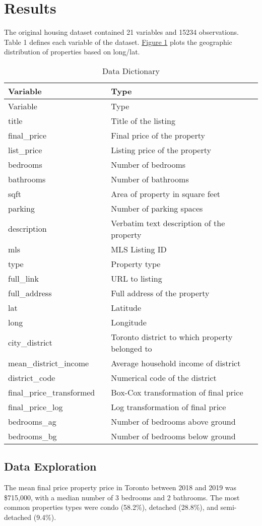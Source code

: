 \documentclass[11pt,]{article}
\begin{document}
\hypertarget{results}{%
\section{Results}\label{results}}

The original housing dataset contained 21 variables and 15234
observations. Table 1 defines each variable of the dataset.
\hyperref[sec:map]{Figure 1} plots the geographic distribution of
properties based on long/lat.

\begin{longtable}[]{@{}lll@{}}
\caption{Data Dictionary}\tabularnewline
\toprule
Variable & & Type\tabularnewline
\midrule
\endfirsthead
\toprule
Variable & & Type\tabularnewline
\midrule
\endhead
title & & Title of the listing\tabularnewline
final\_price & & Final price of the property\tabularnewline
list\_price & & Listing price of the property\tabularnewline
bedrooms & & Number of bedrooms\tabularnewline
bathrooms & & Number of bathrooms\tabularnewline
sqft & & Area of property in square feet\tabularnewline
parking & & Number of parking spaces\tabularnewline
description & & Verbatim text description of the property\tabularnewline
mls & & MLS Listing ID\tabularnewline
type & & Property type\tabularnewline
full\_link & & URL to listing\tabularnewline
full\_address & & Full address of the property\tabularnewline
lat & & Latitude\tabularnewline
long & & Longitude\tabularnewline
city\_district & & Toronto district to which property belonged
to\tabularnewline
mean\_district\_income & & Average household income of
district\tabularnewline
district\_code & & Numerical code of the district\tabularnewline
final\_price\_transformed & & Box-Cox transformation of final
price\tabularnewline
final\_price\_log & & Log transformation of final price\tabularnewline
bedrooms\_ag & & Number of bedrooms above ground\tabularnewline
bedrooms\_bg & & Number of bedrooms below ground\tabularnewline
\bottomrule
\end{longtable}

\hypertarget{data-exploration}{%
\subsection{Data Exploration}\label{data-exploration}}

The mean final price property price in Toronto between 2018 and 2019 was
\$715,000, with a median number of 3 bedrooms and 2 bathrooms. The most
common properties types were condo (58.2\%), detached (28.8\%), and
semi-detached (9.4\%).
\end{document}
